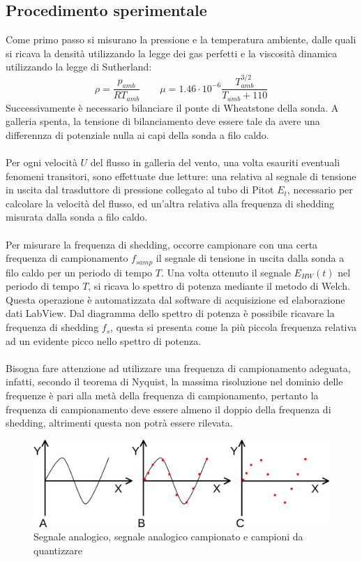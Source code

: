 \subsection{Procedimento sperimentale}
Come primo passo si misurano la pressione e la temperatura ambiente, dalle quali si ricava la densità utilizzando la legge dei gas perfetti e la viscosità dinamica utilizzando la legge di Sutherland:
\begin{equation*}
    \rho = \frac{p_{amb}}{RT_{amb}} \qquad \mu = 1.46\cdot10^{-6} \frac{T_{amb}^{3/2}}{T_{amb}+110} 
\end{equation*}
Successivamente è necessario bilanciare il ponte di Wheatstone della sonda. A galleria spenta, la tensione di bilanciamento deve essere tale da avere una differennza di potenziale nulla ai capi della sonda a filo caldo.\\\\
Per ogni velocità $U$ del flusso in galleria del vento, una volta esauriti eventuali fenomeni transitori, sono effettuate due letture: una relativa al segnale di tensione in uscita dal trasduttore di pressione collegato al tubo di Pitot $E_t$, necessario per calcolare la velocità del flusso, ed un'altra relativa alla frequenza di shedding misurata dalla sonda a filo caldo.\\\\
Per misurare la frequenza di shedding, occorre campionare con una certa frequenza di campionamento $f_{samp}$ il segnale di tensione in uscita dalla sonda a filo caldo per un periodo di tempo $T$. Una volta ottenuto il segnale $E_{HW}(t)$ nel periodo di tempo $T$, si ricava lo spettro di potenza mediante il metodo di Welch. Questa operazione è automatizzata dal software di acquisizione ed elaborazione dati LabView. Dal diagramma dello spettro di potenza è possibile ricavare la frequenza di shedding $f_s$, questa si presenta come la più piccola frequenza relativa ad un evidente picco nello spettro di potenza.\\\\
Bisogna fare attenzione ad utilizzare una frequenza di campionamento adeguata, infatti, secondo il teorema di Nyquist, la massima risoluzione nel dominio delle frequenze è pari alla metà della frequenza di campionamento, pertanto la frequenza di campionamento deve essere almeno il doppio della frequenza di shedding, altrimenti questa non potrà essere rilevata.
\begin{figure}[H]
    \centering
    \includegraphics[width=.7\textwidth]{images/10/nyquist.png}
    \caption{Segnale analogico, segnale analogico campionato e campioni da quantizzare}
\end{figure}

